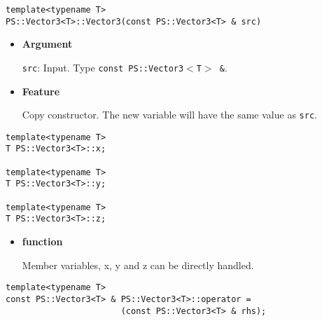 \mbox{}

\begin{screen}
\begin{verbatim}
template<typename T>
PS::Vector3<T>::Vector3(const PS::Vector3<T> & src)
\end{verbatim}
\end{screen}

\begin{itemize}

\item{{\bf Argument}}

\texttt{src}: Input. Type \texttt{const PS::Vector3$<$T$>$ \&}.

\item{{\bf Feature}}

Copy constructor. The new variable will have the same value as \texttt{src}.

\end{itemize}



\begin{screen}
\begin{verbatim}
template<typename T>
T PS::Vector3<T>::x;

template<typename T>
T PS::Vector3<T>::y;

template<typename T>
T PS::Vector3<T>::z;
\end{verbatim}
\end{screen}

\begin{itemize}
  
\item{{\bf function}}
  
  Member variables, {x}, {y} and {z} can be directly handled.
  
\end{itemize}


\mbox{}

\begin{screen}
\begin{verbatim}
template<typename T>
const PS::Vector3<T> & PS::Vector3<T>::operator = 
                       (const PS::Vector3<T> & rhs);
\end{verbatim}
\end{screen}

